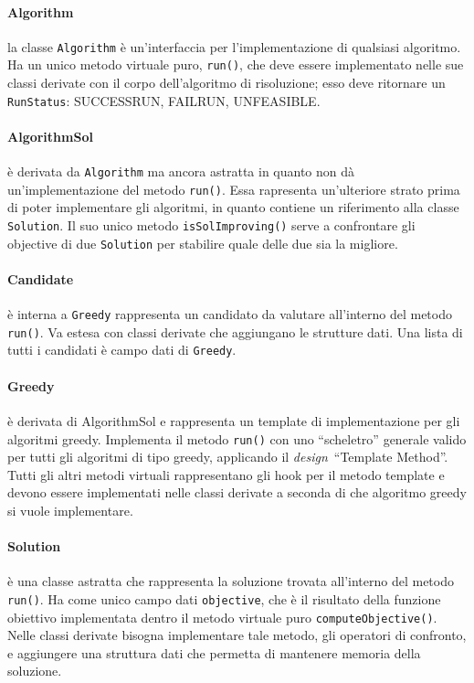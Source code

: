 \paragraph{Algorithm} la classe \texttt{Algorithm} è un'interfaccia per l'implementazione di qualsiasi algoritmo. Ha un unico metodo virtuale puro, \texttt{run()}, che deve essere implementato nelle sue classi derivate con il corpo dell'algoritmo di risoluzione; esso deve ritornare un \texttt{RunStatus}: SUCCESS\textunderscore RUN, FAIL\textunderscore RUN, UNFEASIBLE.
\paragraph{AlgorithmSol} è derivata da \texttt{Algorithm} ma ancora astratta in quanto non dà un'implementazione del metodo \texttt{run()}. Essa rapresenta un'ulteriore strato prima di poter implementare gli algoritmi, in quanto contiene un riferimento alla classe \texttt{Solution}. Il suo unico metodo \texttt{isSolImproving()} serve a confrontare gli objective di due \texttt{Solution} per stabilire quale delle due sia la migliore.
\paragraph{Candidate} è interna a \texttt{Greedy} rappresenta un candidato da valutare all'interno del metodo \texttt{run()}. Va estesa con classi derivate che aggiungano le strutture dati. Una lista di tutti i candidati è campo dati di \texttt{Greedy}.
\paragraph{Greedy} è derivata di AlgorithmSol e rappresenta un template di implementazione per gli algoritmi greedy. Implementa il metodo \texttt{run()} con uno ``scheletro'' generale valido per tutti gli algoritmi di tipo greedy, applicando il \emph{\gls{design}}\glsfirstoccur\ ``Template Method''. Tutti gli altri metodi virtuali rappresentano gli hook per il metodo template e devono essere implementati nelle classi derivate a seconda di che algoritmo greedy si vuole implementare.
\paragraph{Solution} è una classe astratta che rappresenta la soluzione trovata all'interno del metodo \texttt{run()}. Ha come unico campo dati \texttt{objective}, che è il risultato della funzione obiettivo implementata dentro il metodo virtuale puro \texttt{computeObjective()}. Nelle classi derivate bisogna implementare tale metodo, gli operatori di confronto, e aggiungere una struttura dati che permetta di mantenere memoria della soluzione.

